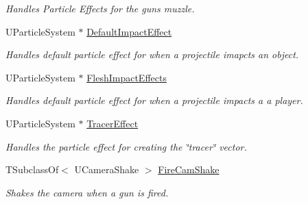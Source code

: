 \begin{DoxyCompactItemize}
\begin{DoxyCompactList}\small\item\em Handles Particle Effects for the gun\textquotesingle{}s muzzle. \end{DoxyCompactList}\item 
\mbox{\label{class_a_my_weapon___gun_ac2f8ae09bfe4a45ffecd1152992b7bd1}} 
U\+Particle\+System $\ast$ \mbox{\hyperlink{class_a_my_weapon___gun_ac2f8ae09bfe4a45ffecd1152992b7bd1}{Default\+Impact\+Effect}}
\begin{DoxyCompactList}\small\item\em Handles default particle effect for when a projectile imapcts an object. \end{DoxyCompactList}\item 
\mbox{\label{class_a_my_weapon___gun_a54d0bc79091a1c6c1ff1024a504a913e}} 
U\+Particle\+System $\ast$ \mbox{\hyperlink{class_a_my_weapon___gun_a54d0bc79091a1c6c1ff1024a504a913e}{Flesh\+Impact\+Effects}}
\begin{DoxyCompactList}\small\item\em Handles default particle effect for when a projectile impacts a a player. \end{DoxyCompactList}\item 
\mbox{\label{class_a_my_weapon___gun_a14dd5df426696f79aa347bb870e55a8a}} 
U\+Particle\+System $\ast$ \mbox{\hyperlink{class_a_my_weapon___gun_a14dd5df426696f79aa347bb870e55a8a}{Tracer\+Effect}}
\begin{DoxyCompactList}\small\item\em Handles the particle effect for creating the \char`\"{}tracer\char`\"{} vector. \end{DoxyCompactList}\item 
\mbox{\label{class_a_my_weapon___gun_ac88147e1d8d4c2e0fcc4b99508151d95}} 
T\+Subclass\+Of$<$ U\+Camera\+Shake $>$ \mbox{\hyperlink{class_a_my_weapon___gun_ac88147e1d8d4c2e0fcc4b99508151d95}{Fire\+Cam\+Shake}}
\begin{DoxyCompactList}\small\item\em Shakes the camera when a gun is fired. \end{DoxyCompactList}\item 
\mbox{\label{class_a_my_weapon___gun_a249e1fd79607e29492373ec47fdea572}} 

\end{DoxyCompactItemize}
